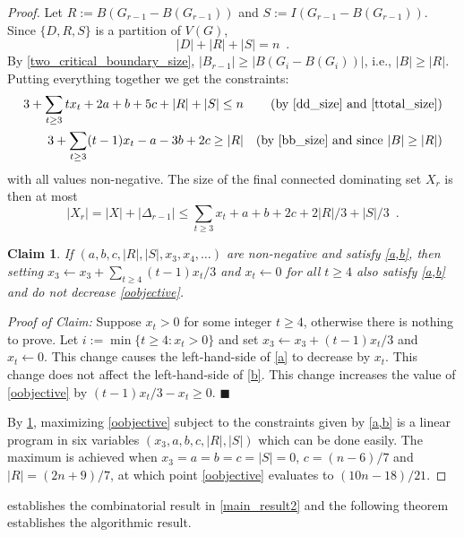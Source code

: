 \documentclass[11pt]{article}
\newtheorem{clm}{Claim}
\newenvironment{clmproof}{\noindent\emph{Proof of Claim:}}{\hfill{$\blacksquare$}\par}
\theoremstyle{definition}
\begin{document}
\begin{proof}
  Let $R:=B(G_{r-1}-B(G_{r-1}))$ and $S:=I(G_{r-1}-B(G_{r-1}))$.  Since $\{D,R,S\}$ is a partition of $V(G)$,
  \begin{equation}
    |D|+|R|+|S|= n \enspace . \label{ttotal_size}
  \end{equation}
  By \cref{two_critical_boundary_size}, $|B_{r-1}|\ge |B(G_i-B(G_i))|$, i.e., $|B|\ge |R|$.  Putting everything together we get the constraints:
  \begin{align}
        3 + \sum_{t\ge 3}tx_t + 2a + b + 5c + |R| + |S| \le n&
          & \text{(by \cref{dd_size} and \cref{ttotal_size})}  \label{a} \\
        3 + \sum_{t\ge 3}(t-1)x_t - a - 3b + 2c \ge |R|
          & & \text{(by \cref{bb_size} and since $|B|\ge |R|$)} \label{b}
  \end{align}
  with all values non-negative.  The size of the final connected dominating set $X_r$ is then at most
  \begin{equation}
    |X_r| = |X| + |\Delta_{r-1}| \le \sum_{t\ge 3}x_t + a + b + 2c + 2|R|/3 + |S|/3  \enspace . \label{oobjective}
  \end{equation}

  \begin{clm}\label{simplify}
    If $(a,b,c,|R|,|S|,x_3,x_4,\ldots)$ are non-negative and satisfy \cref{a,b}, then setting $x_3\gets x_3+\sum_{t\ge 4}(t-1)x_t/3$ and $x_t\gets 0$ for all $t\ge 4$ also satisfy \cref{a,b} and do not decrease \cref{oobjective}.
  \end{clm}

  \begin{clmproof}
    Suppose $x_t>0$ for some integer $t\ge 4$, otherwise there is nothing to prove.  Let $i:=\min\{t\ge 4: x_t>0\}$ and set $x_3\gets x_3+(t-1)x_t/3$ and $x_t\gets 0$. This change causes the left-hand-side of \cref{a} to decrease by $x_t$. This change does not affect the left-hand-side of \cref{b}.  This change increases the value of \cref{oobjective} by $(t-1)x_t/3-x_t\ge 0$.
  \end{clmproof}

  By \cref{simplify}, maximizing \cref{oobjective} subject to the constraints given by \cref{a,b} is a linear program in six variables $(x_3,a,b,c,|R|,|S|)$ which can be done easily.  The maximum is achieved when $x_3=a=b=c=|S|=0$, $c=(n-6)/7$ and $|R|=(2n+9)/7$, at which point \cref{oobjective} evaluates to $(10n-18)/21$.
\end{proof}

 establishes the combinatorial result in \cref{main_result2} and the following theorem establishes the algorithmic result.
\end{document}
